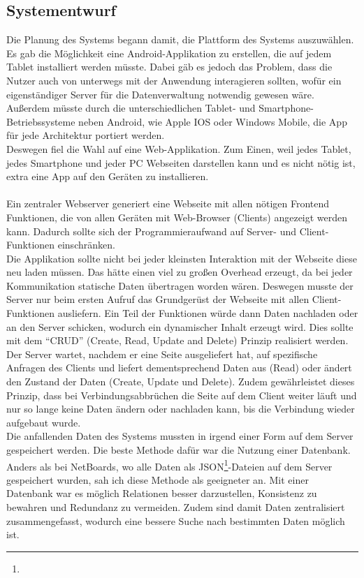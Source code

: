 \subsection{Systementwurf}\label{Systementwurf}
Die Planung des Systems begann damit, die Plattform des Systems auszuwählen. Es gab die Möglichkeit eine Android-Applikation zu erstellen, die auf jedem Tablet installiert werden müsste. Dabei gäb es jedoch das Problem, dass die Nutzer auch von unterwegs mit der Anwendung interagieren sollten, wofür ein eigenständiger Server für die Datenverwaltung notwendig gewesen wäre. Außerdem müsste durch die unterschiedlichen Tablet- und Smartphone-Betriebssysteme neben Android, wie Apple IOS oder Windows Mobile, die App für jede Architektur portiert werden.
\\
Deswegen fiel die Wahl auf eine Web-Applikation. Zum Einen, weil jedes Tablet, jedes Smartphone und jeder PC Webseiten darstellen kann und es nicht nötig ist, extra eine App auf den Geräten zu installieren.
\\ \\
Ein zentraler Webserver generiert eine Webseite mit allen nötigen Frontend Funktionen, die von allen Geräten mit Web-Browser (Clients) angezeigt werden kann. Dadurch sollte sich der Programmieraufwand auf Server- und Client-Funktionen einschränken.
\\
Die Applikation sollte nicht bei jeder kleinsten Interaktion mit der Webseite diese neu laden müssen. Das hätte einen viel zu großen Overhead erzeugt, da bei jeder Kommunikation statische Daten übertragen worden wären.
Deswegen musste der Server nur beim ersten Aufruf das Grundgerüst der Webseite mit allen Client-Funktionen ausliefern. Ein Teil der Funktionen würde dann Daten nachladen oder an den Server schicken, wodurch ein dynamischer Inhalt erzeugt wird.
Dies sollte mit dem ``CRUD'' (Create, Read, Update and Delete) Prinzip realisiert werden.
Der Server wartet, nachdem er eine Seite ausgeliefert hat, auf spezifische Anfragen des Clients und liefert dementsprechend Daten aus (Read) oder ändert den Zustand der Daten (Create, Update und Delete). Zudem gewährleistet dieses Prinzip, dass bei Verbindungsabbrüchen die Seite auf dem Client weiter läuft und nur so lange keine Daten ändern oder nachladen kann, bis die Verbindung wieder aufgebaut wurde.
\\
Die anfallenden Daten des Systems mussten in irgend einer Form auf dem Server gespeichert werden. Die beste Methode dafür war die Nutzung einer Datenbank. Anders als bei NetBoards, wo alle Daten als JSON\footnote{}-Dateien auf dem Server gespeichert wurden, sah ich diese Methode als geeigneter an. Mit einer Datenbank war es möglich Relationen besser darzustellen, Konsistenz zu bewahren und Redundanz zu vermeiden. Zudem sind damit Daten zentralisiert zusammengefasst, wodurch eine bessere Suche nach bestimmten Daten möglich ist.
